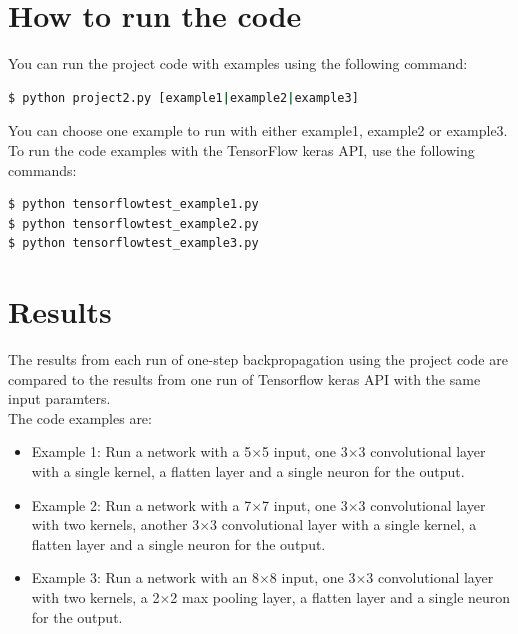 \documentclass[12pt]{amsart}
\begin{document}
\section{How to run the code}
You can run the project code with examples using the following command:
\begin{lstlisting}[language=bash]
$ python project2.py [example1|example2|example3]
\end{lstlisting}

You can choose one example to run with either example1, example2 or example3. \\

To run the code examples with the TensorFlow keras API, use the following commands:
\begin{lstlisting}[language=bash]
$ python tensorflowtest_example1.py
$ python tensorflowtest_example2.py
$ python tensorflowtest_example3.py
\end{lstlisting}

\section{Results}
The results from each run of one-step backpropagation using the project code are compared to the results from one run of Tensorflow keras API with the same input paramters.\\

The code examples are:
\begin{itemize}
\item Example 1: Run a network with a 5$\times$5 input, one 3$\times$3 convolutional layer with a single kernel, a flatten layer and a single neuron for the output.

\item Example 2: Run a network with a 7$\times$7 input, one 3$\times$3 convolutional layer with two kernels, another 3$\times$3 convolutional layer with a single kernel, a flatten layer and a single neuron for the output.

\item Example 3: Run a network with an 8$\times$8 input, one 3$\times$3 convolutional layer with two kernels, a 2$\times$2 max pooling layer, a flatten layer and a single neuron for the output. 
\end{itemize}
\end{document}
